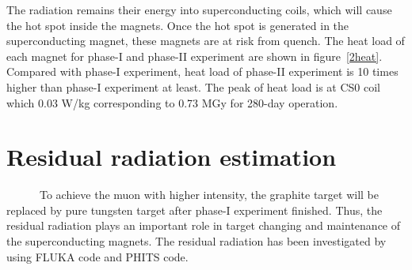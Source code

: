 The radiation remains their energy into superconducting coils, which will cause the hot spot inside the magnets.
Once the hot spot is generated in the superconducting magnet, these magnets are at risk from quench.
The heat load of each magnet for phase-I and phase-II experiment are shown in figure~\ref{2heat}.
Compared with phase-I experiment, heat load of phase-II experiment is 10 times higher than phase-I experiment at least.
The peak of heat load is at CS0 coil which 0.03 W/kg corresponding to 0.73 MGy for 280-day operation.

 \section{Residual radiation estimation}
~~~~~~To achieve the muon with higher intensity, the graphite target will be replaced by pure tungsten target after phase-I experiment finished.
Thus, the residual radiation plays an important role in target changing and maintenance of the superconducting magnets.
The residual radiation has been investigated by using FLUKA code and PHITS code.



